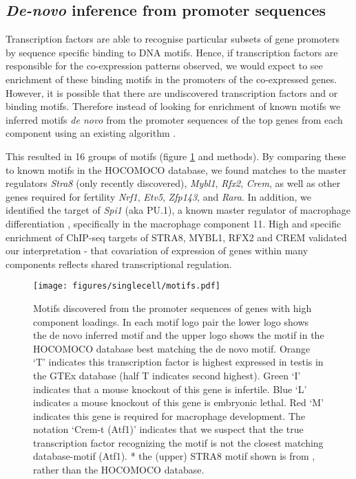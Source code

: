 \subsection{\emph{De-novo} inference from promoter sequences}
Transcription factors are able to recognise particular subsets of gene promoters by sequence specific binding to DNA motifs.
Hence, if transcription factors are responsible for the co-expression patterns observed, we would expect to see enrichment of these binding motifs in the promoters of the co-expressed genes.
However, it is possible that there are undiscovered transcription factors and or binding motifs.
Therefore instead of looking for enrichment of known motifs we inferred motifs \textit{de novo} from the promoter sequences of the top genes from each component using an existing algorithm \parencite{Altemose2017map, Davies2016Reengineering}.

This resulted in 16 groups of motifs (figure \ref{fig:motifs} and methods).
By comparing these to known motifs in the HOCOMOCO database, we found matches to the master regulators \textit{Stra8} (only recently discovered), \textit{Mybl1}, \textit{Rfx2}, \textit{Crem}, as well as other genes required for fertility \textit{Nrf1}, \textit{Etv5}, \textit{Zfp143}, and \textit{Rara}.
In addition, we identified the target of \textit{Spi1} (aka PU.1), a known master regulator of macrophage differentiation \parencite{Rosa2007interplay}, specifically in the macrophage component 11.
High and specific enrichment of ChIP-seq targets of STRA8, MYBL1, RFX2 and CREM validated our interpretation - that covariation of expression of genes within many components reflects shared transcriptional regulation.

\begin{figure}[H]
	\centering
	\texttt{[image: figures/singlecell/motifs.pdf]}
	\caption[Denovo Motifs]{
		Motifs discovered from the promoter sequences of genes with high component loadings.
		In each motif logo pair the lower logo shows the de novo inferred motif and the upper logo shows the motif in the HOCOMOCO database best matching the de novo motif.
		Orange ‘T’ indicates this transcription factor is highest expressed in testis in the GTEx database (half T indicates second highest).
		Green ‘I’ indicates that a mouse knockout of this gene is infertile.
		Blue ‘L’ indicates a mouse knockout of this gene is embryonic lethal.
		Red ‘M’ indicates this gene is required for macrophage development.
		The notation ‘Crem-t (Atf1)’ indicates that we suspect that the true transcription factor recognizing the motif is not the closest matching database-motif (Atf1).
		* the (upper) STRA8 motif shown is from \cite{Kojima2019Amplification}, rather than the HOCOMOCO database.
	}
	\label{fig:motifs}
\end{figure}

